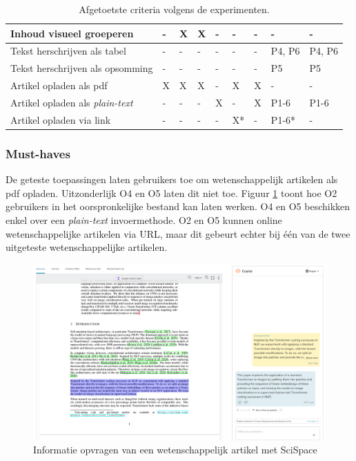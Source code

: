 \begin{table}[H]
\begin{tabular}{ | m{8cm} | m{0.5cm} | m{0.5cm} | m{0.5cm} | m{0.5cm} | m{0.5cm} | m{0.5cm} | m{1cm} | m{1cm} | }
		Inhoud visueel groeperen & - & X & X & - & - & - & - & - \\ \hline
		Tekst herschrijven als tabel & - & - & - & - & - & - & P4, P6 & P4, P6 \\ \hline
		Tekst herschrijven als opsomming & - & - & - & - & - & - & P5 & P5 \\ \hline
		Artikel opladen als pdf & X & X & X & - & X & X & - & - \\ \hline
		Artikel opladen als \textit{plain-text} & - & - & - & X & - & X & P1-6 & P1-6 \\ \hline
		Artikel opladen via link & - & - & - & - & X* & - & P1-6* & - \\ \hline
	\end{tabular}
	\caption{Afgetoetste criteria volgens de experimenten.}
	\label{table:afgetoetste-criteria}
\end{table}

\subsubsection{Must-haves}

De geteste toepassingen laten gebruikers toe om wetenschappelijk artikelen als pdf opladen. Uitzonderlijk O4 en O5 laten dit niet toe. Figuur \ref{img:scispace-example} toont hoe O2 gebruikers in het oorspronkelijke bestand kan laten werken. O4 en O5 beschikken enkel over een \textit{plain-text} invoermethode. O2 en O5 kunnen online wetenschappelijke artikelen via URL, maar dit gebeurt echter bij één van de twee uitgeteste wetenschappelijke artikelen.

\begin{figure}[H]
	\includegraphics[width=\linewidth]{img/typeset-example.png}
	\caption{Informatie opvragen van een wetenschappelijk artikel met SciSpace}
	\label{img:scispace-example}
\end{figure}

